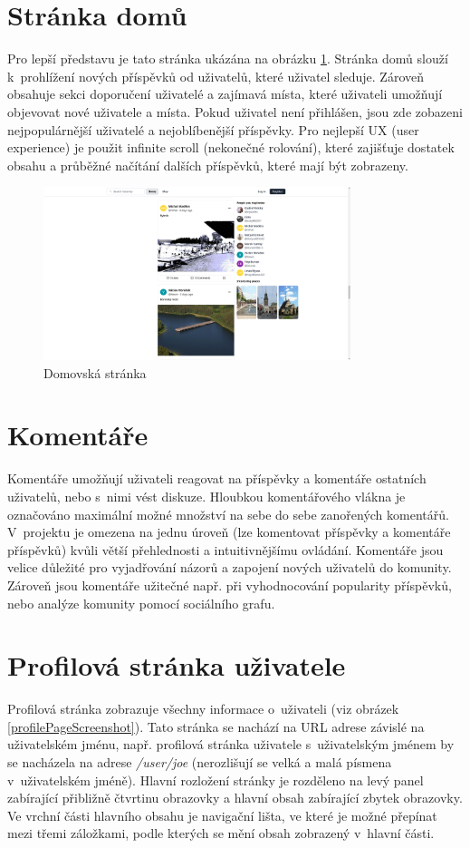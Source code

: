 \documentclass[12pt, a4paper,
  oneside,      %
]{report}
\begin{document}
\section{Stránka domů}
Pro lepší představu je tato stránka ukázána na obrázku \ref{figure:homePagePreview}. Stránka domů slouží k~prohlížení nových příspěvků od uživatelů, které uživatel sleduje. Zároveň obsahuje sekci doporučení uživatelé a zajímavá místa, které uživateli umožňují objevovat nové uživatele a místa. Pokud uživatel není přihlášen, jsou zde zobazeni nejpopulárnější uživatelé a nejoblíbenější příspěvky. Pro nejlepší UX (user experience) je použit infinite scroll (nekonečné rolování), které zajišťuje dostatek obsahu a průběžné načítání dalších příspěvků, které mají být zobrazeny.

\begin{figure}[h]
	\centering
	\includegraphics[width=0.8\textwidth]{images/home_page.png}
	\caption{Domovská stránka}\label{figure:homePagePreview}
\end{figure}

\section{Komentáře}
Komentáře umožňují uživateli reagovat na příspěvky a komentáře ostatních uživatelů, nebo s~nimi vést diskuze. Hloubkou komentářového vlákna je označováno maximální možné množství na sebe do sebe zanořených komentářů. V~projektu je omezena na jednu úroveň (lze komentovat příspěvky a komentáře příspěvků) kvůli větší přehlednosti a intuitivnějšímu ovládání. Komentáře jsou velice důležité pro vyjadřování názorů a zapojení nových uživatelů do komunity. Zároveň jsou komentáře užitečné např. při vyhodnocování popularity příspěvků, nebo analýze komunity pomocí sociálního grafu.
\cite{whyAreCommentsImportant}

\section{Profilová stránka uživatele}
Profilová stránka zobrazuje všechny informace o~uživateli (viz obrázek \ref{profilePageScreenshot}). Tato stránka se nachází na URL adrese závislé na uživatelském jménu, např. profilová stránka uživatele s~uživatelským jménem  by se nacházela na adrese \textit{/user/joe} (nerozlišují se velká a malá písmena v~uživatelském jméně). Hlavní rozložení stránky je rozděleno na levý panel zabírající přibližně čtvrtinu obrazovky a hlavní obsah zabírající zbytek obrazovky. Ve vrchní části hlavního obsahu je navigační lišta, ve které je možné přepínat mezi třemi záložkami, podle kterých se mění obsah zobrazený v~hlavní části.
\end{document}
